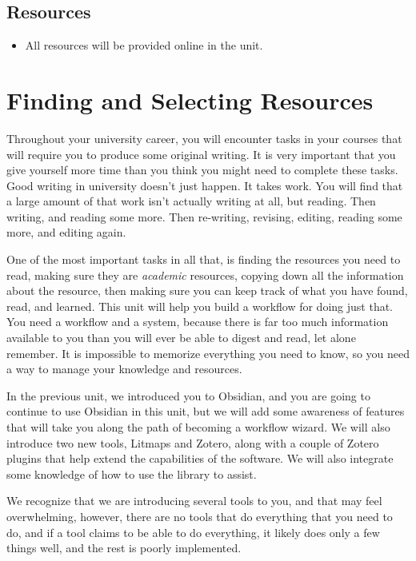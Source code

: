 \documentclass[
]{book}
\providecommand{\tightlist}{%
  \setlength{\itemsep}{0pt}\setlength{\parskip}{0pt}}
\theoremstyle{definition}
\theoremstyle{definition}
\theoremstyle{definition}
\theoremstyle{definition}
\theoremstyle{remark}
\begin{document}
\hypertarget{resources-1}{%
\subsection*{Resources}\label{resources-1}}

\begin{itemize}
\tightlist
\item
  All resources will be provided online in the unit.
\end{itemize}

\hypertarget{finding-and-selecting-resources}{%
\section{Finding and Selecting Resources}\label{finding-and-selecting-resources}}

Throughout your university career, you will encounter tasks in your courses that will require you to produce some original writing. It is very important that you give yourself more time than you think you might need to complete these tasks. Good writing in university doesn't just happen. It takes work. You will find that a large amount of that work isn't actually writing at all, but reading. Then writing, and reading some more. Then re-writing, revising, editing, reading some more, and editing again.

One of the most important tasks in all that, is finding the resources you need to read, making sure they are \emph{academic} resources, copying down all the information about the resource, then making sure you can keep track of what you have found, read, and learned. This unit will help you build a workflow for doing just that. You need a workflow and a system, because there is far too much information available to you than you will ever be able to digest and read, let alone remember. It is impossible to memorize everything you need to know, so you need a way to manage your knowledge and resources.

In the previous unit, we introduced you to Obsidian, and you are going to continue to use Obsidian in this unit, but we will add some awareness of features that will take you along the path of becoming a workflow wizard. We will also introduce two new tools, Litmaps and Zotero, along with a couple of Zotero plugins that help extend the capabilities of the software. We will also integrate some knowledge of how to use the library to assist.

We recognize that we are introducing several tools to you, and that may feel overwhelming, however, there are no tools that do everything that you need to do, and if a tool claims to be able to do everything, it likely does only a few things well, and the rest is poorly implemented.
\end{document}
